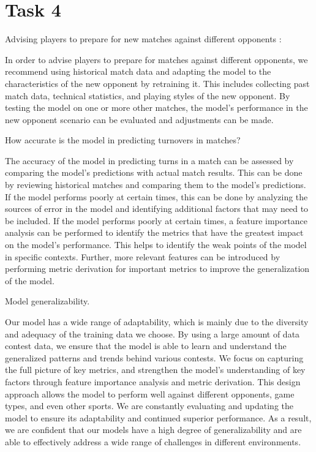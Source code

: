 \documentclass{mcmthesis}
\begin{document}
\section{Task 4}
Advising players to prepare for new matches against different opponents :

In order to advise players to prepare for matches against different opponents, we recommend using historical match data and adapting the model to the characteristics of the new opponent by retraining it. This includes collecting past match data, technical statistics, and playing styles of the new opponent. By testing the model on one or more other matches, the model's performance in the new opponent scenario can be evaluated and adjustments can be made.

How accurate is the model in predicting turnovers in matches?

The accuracy of the model in predicting turns in a match can be assessed by comparing the model's predictions with actual match results. This can be done by reviewing historical matches and comparing them to the model's predictions. If the model performs poorly at certain times, this can be done by analyzing the sources of error in the model and identifying additional factors that may need to be included. If the model performs poorly at certain times, a feature importance analysis can be performed to identify the metrics that have the greatest impact on the model's performance. This helps to identify the weak points of the model in specific contexts. Further, more relevant features can be introduced by performing metric derivation for important metrics to improve the generalization of the model.

Model generalizability.

Our model has a wide range of adaptability, which is mainly due to the diversity and adequacy of the training data we choose. By using a large amount of data contest data, we ensure that the model is able to learn and understand the generalized patterns and trends behind various contests. We focus on capturing the full picture of key metrics, and strengthen the model's understanding of key factors through feature importance analysis and metric derivation. This design approach allows the model to perform well against different opponents, game types, and even other sports. We are constantly evaluating and updating the model to ensure its adaptability and continued superior performance. As a result, we are confident that our models have a high degree of generalizability and are able to effectively address a wide range of challenges in different environments.
\end{document}
